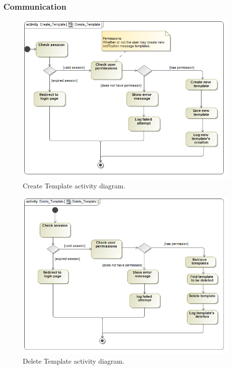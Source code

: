 \documentclass [a4paper,12pt] {article}
\begin{document}
		\subsubsection{Communication}
			\begin{figure}[H]
				\centering
				\includegraphics[width=1.0\textwidth]{CreateTemplateAD.png}
				\caption{Create Template activity diagram.}
			\end{figure}
			\begin{figure}[H]
				\centering
				\includegraphics[width=1.0\textwidth]{DeleteTemplateAD.png}
				\caption{Delete Template activity diagram.}
			\end{figure}
\end{document}
